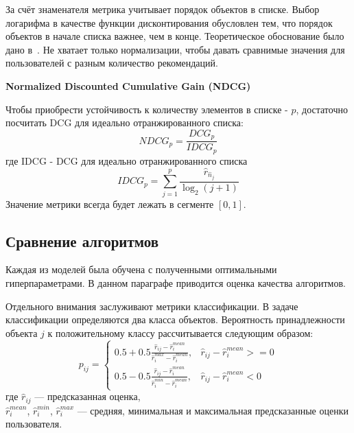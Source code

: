 За счёт знаменателя метрика учитывает порядок объектов в списке.
Выбор логарифма в качестве функции дисконтирования обусловлен тем, что порядок объектов в начале списка важнее, чем в конце.
Теоретическое обоснование было дано в~\cite{dcg-log}.
Не хватает только нормализации, чтобы давать сравнимые значения для пользователей с разным количество рекомендаций.

\vspace{1em}
\textbf{Normalized Discounted Cumulative Gain (NDCG)}

Чтобы приобрести устойчивость к количеству элементов в списке - $p$, достаточно посчитать DCG для идеально отранжированного списка:
\begin{equation}\label{eq:ndcg}
NDCG_p = \frac{DCG_p}{IDCG_p}
\end{equation}
где IDCG - DCG для идеально отранжированного списка
\begin{equation}\label{eq:idcg}
IDCG_p = \sum_{j=1}^{p}\frac{\hat{r}_{\hat{n}_j}}{\log_2 (j + 1)}
\end{equation}
Значение метрики всегда будет лежать в сегменте $[0,1]$.


\pagebreak
\subsection{Сравнение алгоритмов}\label{subsec:algos_comparison}
Каждая из моделей была обучена с полученными оптимальными гиперпараметрами.
В данном параграфе приводится оценка качества алгоритмов.

Отдельного внимания заслуживают метрики классификации.
В задаче классификации определяются два класса объектов.
Вероятность принадлежности объекта $j$ к положительному классу рассчитывается следующим образом:
\begin{equation}
p_{ij} =
\begin{cases}
    0.5 + 0.5 \frac{\hat{r}_{ij} - \hat{r}_{i}^{mean}}{\hat{r}_{i}^{max} - \hat{r}_{i}^{mean}}, & \hat{r}_{ij} - \hat{r}_{i}^{mean} >= 0 \\
    0.5 - 0.5 \frac{\hat{r}_{ij} - \hat{r}_{i}^{mean}}{\hat{r}_{i}^{min} - \hat{r}_{i}^{mean}}, & \hat{r}_{ij} - \hat{r}_{i}^{mean} < 0
\end{cases}\label{eq:class_proba}
\end{equation}
где
$\hat{r}_{ij}$ --- предсказанная оценка, \\
$\hat{r}_{i}^{mean}$, $\hat{r}_{i}^{min}$, $\hat{r}_{i}^{max}$ --- средняя, минимальная и максимальная предсказанные оценки пользователя.

